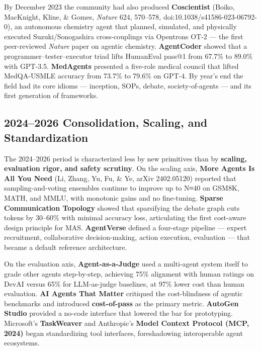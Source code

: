 \documentclass{article}
\begin{document}
By December 2023 the community had also produced \textbf{Coscientist} (Boiko, MacKnight, Kline, \& Gomes, \emph{Nature} 624, 570--578, doi:10.1038/s41586-023-06792-0), an autonomous chemistry agent that planned, simulated, and physically executed Suzuki/Sonogashira cross-couplings via Opentrons OT-2 --- the first peer-reviewed \emph{Nature} paper on agentic chemistry. \textbf{AgentCoder} \citep{huang2023agentcodermultiage} showed that a programmer--tester--executor triad lifts HumanEval pass@1 from 67.7\% to 89.0\% with GPT-3.5. \textbf{MedAgents} \citep{tang2024medagentslargelang} presented a five-role medical council that lifted MedQA-USMLE accuracy from 73.7\% to 79.6\% on GPT-4. By year's end the field had its core idioms --- inception, SOPs, debate, society-of-agents --- and its first generation of frameworks.

\subsection{2024--2026 Consolidation, Scaling, and Standardization}\label{consolidation-scaling-and-standardization}

The 2024--2026 period is characterized less by new primitives than by \textbf{scaling, evaluation rigor, and safety scrutiny}. On the scaling axis, \textbf{More Agents Is All You Need} (Li, Zhang, Yu, Fu, \& Ye, arXiv 2402.05120) reported that sampling-and-voting ensembles continue to improve up to N≈40 on GSM8K, MATH, and MMLU, with monotonic gains and no fine-tuning. \textbf{Sparse Communication Topology} \citep{li2024asurveyonllmbasedm} showed that sparsifying the debate graph cuts tokens by 30--60\% with minimal accuracy loss, articulating the first cost-aware design principle for MAS. \textbf{AgentVerse} \citep{chen2024asurveyonllmbasedm} defined a four-stage pipeline --- expert recruitment, collaborative decision-making, action execution, evaluation --- that became a default reference architecture.

On the evaluation axis, \textbf{Agent-as-a-Judge} \citep{zhuge20242024} used a multi-agent system itself to grade other agents step-by-step, achieving 75\% alignment with human ratings on DevAI versus 65\% for LLM-as-judge baselines, at 97\% lower cost than human evaluation. \textbf{AI Agents That Matter} \citep{kapoor2024aiagentsthatmatter} critiqued the cost-blindness of agentic benchmarks and introduced \textbf{cost-of-pass} as the primary metric. \textbf{AutoGen Studio} \citep{dibia2024autogenstudioanoco} provided a no-code interface that lowered the bar for prototyping. Microsoft's \textbf{TaskWeaver} and Anthropic's \textbf{Model Context Protocol (MCP, 2024)} began standardizing tool interfaces, foreshadowing interoperable agent ecosystems.
\end{document}

